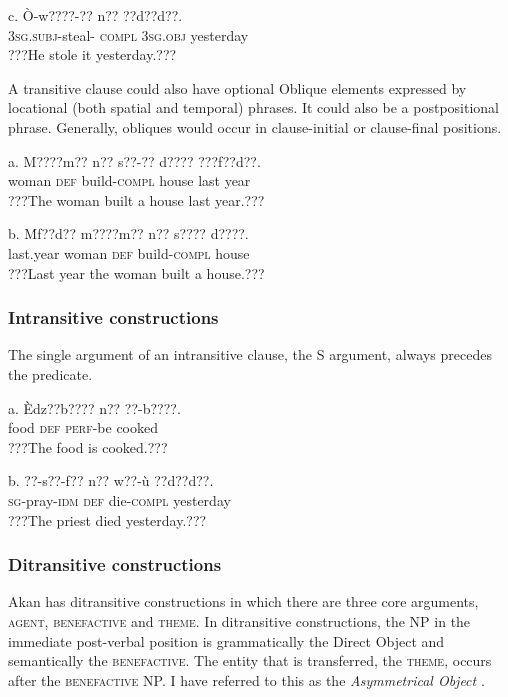 \documentclass[output=paper]{langsci/langscibook}
\begin{document}
\ea
\gll  c.  \`{O}-w????-??      n??    ??d??d??.\\
       \textsc{3sg.subj}{}-steal-\textsc{ compl}  \textsc{3sg.obj}  yesterday\\
\glt   ???He stole it yesterday.???
\z

A transitive clause could also have optional Oblique elements expressed by locational (both spatial and temporal) phrases. It could also be a postpositional phrase. Generally, obliques would occur in clause-initial or clause-final positions. 

\ea
\gll a.  M????m??    n??  s??-??    d????  ???f??d??.\\
       woman    \textsc{def}  build-\textsc{compl}  house  last year\\
\glt   ???The woman built a house last year.???
\z

\ea
\gll  b.  \'{M}f??d??    m????m??    n??  s????    d????.\\
       last.year  woman    \textsc{def}  build-\textsc{compl}  house\\
\glt   ???Last year the woman built a house.???
\z

\subsubsection{Intransitive constructions}

The single argument of an intransitive clause, the S argument, always precedes the predicate. 


\ea
\gll a.  \`{E}dz??b????  n??  ??-b????.  \\
       food    \textsc{def}  \textsc{perf}{}-be cooked\\
\glt   ???The food is cooked.???  
\z

\ea
\gll b.  ??{}-s??-f??      n??  w??-\`{u}    ??d??d??.\\
       \textsc{sg}{}-pray-\textsc{idm}    \textsc{def}  die-\textsc{compl}  yesterday\\
\glt   ???The priest died yesterday.???
\z

\subsubsection{Ditransitive constructions}

Akan has ditransitive constructions in which there are three core arguments, \textsc{agent, benefactive} and \textsc{theme}. In ditransitive constructions, the NP in the immediate post-verbal position is grammatically the Direct Object and semantically the \textsc{benefactive}. The entity that is transferred, the \textsc{theme}, occurs after the \textsc{benefactive} NP. I have referred to this as the \emph{Asymmetrical Object} \citep{Osam2000}.
\end{document}
